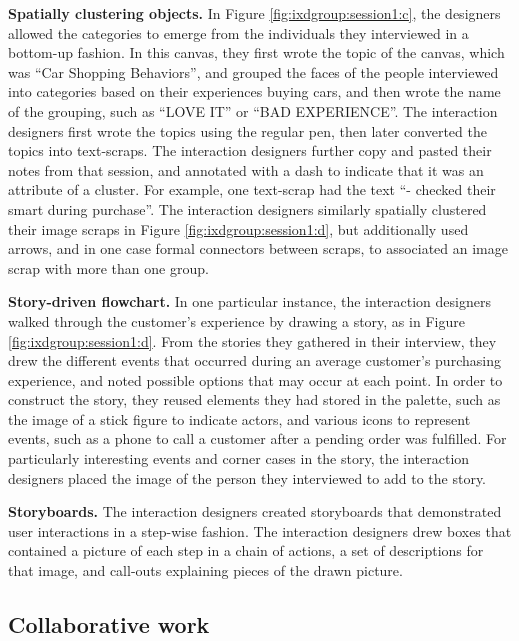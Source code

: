 \textbf{Spatially clustering objects.} In Figure \ref{fig:ixdgroup:session1:c}, the designers allowed the categories to emerge from the individuals they interviewed in a bottom-up fashion. In this canvas, they first wrote the topic of the canvas, which was ``Car Shopping Behaviors'', and grouped the faces of the people interviewed into categories based on their experiences buying cars, and then wrote the name of the grouping, such as ``LOVE IT'' or ``BAD EXPERIENCE''. The interaction designers first wrote the topics using the regular pen, then later converted the topics into text-scraps. The interaction designers further copy and pasted their notes from that session, and annotated with a dash to indicate that it was an attribute of a cluster. For example, one text-scrap had the text ``- checked their smart during purchase''. The interaction designers similarly spatially clustered their image scraps in Figure \ref{fig:ixdgroup:session1:d}, but additionally used arrows, and in one case formal connectors between scraps, to associated an image scrap with more than one group.

\textbf{Story-driven flowchart. } In one particular instance, the interaction designers walked through the customer's experience by drawing a story, as in Figure \ref{fig:ixdgroup:session1:d}. From the stories they gathered in their interview, they drew the different events that occurred during an average customer's purchasing experience, and noted possible options that may occur at each point. In order to construct the story, they reused elements they had stored in the palette, such as the image of a stick figure to indicate actors, and various icons to represent events, such as a phone to call a customer after a pending order was fulfilled. For particularly interesting events and corner cases in the story, the interaction designers placed the image of the person they interviewed to add to the story. 

\textbf{Storyboards.} The interaction designers created storyboards that demonstrated user interactions in a step-wise fashion. The interaction designers drew boxes that contained a picture of each step in a chain of actions, a set of descriptions for that image, and call-outs explaining pieces of the drawn picture.

\subsection{Collaborative work}

